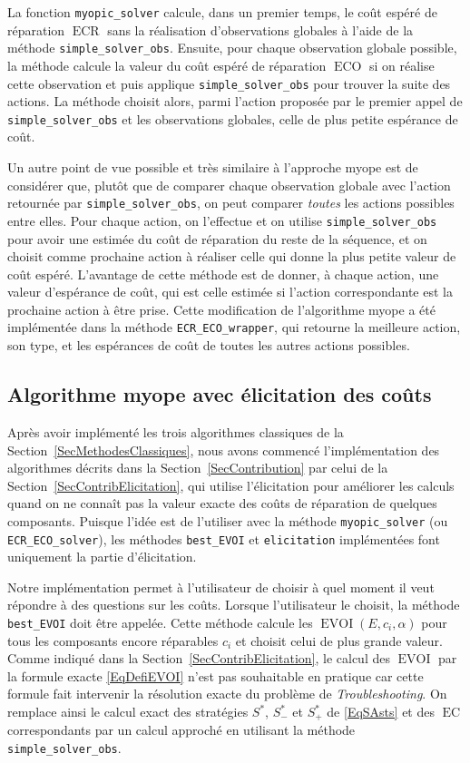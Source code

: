 \documentclass[a4paper,11pt]{article}
\theoremstyle{plain}
\theoremstyle{definition}
\DeclareMathOperator{\ECO}{ECO}
\DeclareMathOperator{\ECR}{ECR}
\DeclareMathOperator{\EC}{EC}
\DeclareMathOperator{\EVOI}{EVOI}
\begin{document}
La fonction \texttt{myopic\_solver} calcule, dans un premier temps, le coût espéré de réparation $\ECR$ sans la réalisation d'observations globales à l'aide de la méthode \texttt{simple\_solver\_obs}. Ensuite, pour chaque observation globale possible, la méthode calcule la valeur du coût espéré de réparation $\ECO$ si on réalise cette observation et puis applique \texttt{simple\_solver\_obs} pour trouver la suite des actions. La méthode choisit alors, parmi l'action proposée par le premier appel de \texttt{simple\_solver\_obs} et les observations globales, celle de plus petite espérance de coût.

Un autre point de vue possible et très similaire à l'approche myope est de considérer que, plutôt que de comparer chaque observation globale avec l'action retournée par \texttt{simple\_solver\_obs}, on peut comparer \emph{toutes} les actions possibles entre elles. Pour chaque action, on l'effectue et on utilise \texttt{simple\_solver\_obs} pour avoir une estimée du coût de réparation du reste de la séquence, et on choisit comme prochaine action à réaliser celle qui donne la plus petite valeur de coût espéré. L'avantage de cette méthode est de donner, à chaque action, une valeur d'espérance de coût, qui est celle estimée si l'action correspondante est la prochaine action à être prise. Cette modification de l'algorithme myope a été implémentée dans la méthode \texttt{ECR\_ECO\_wrapper}, qui retourne la meilleure action, son type, et les espérances de coût de toutes les autres actions possibles.

\subsection{Algorithme myope avec élicitation des coûts}
\label{SecImplElicitation}

Après avoir implémenté les trois algorithmes classiques de la Section~\ref{SecMethodesClassiques}, nous avons commencé l'implémentation des algorithmes décrits dans la Section~\ref{SecContribution} par celui de la Section~\ref{SecContribElicitation}, qui utilise l'élicitation pour améliorer les calculs quand on ne connaît pas la valeur exacte des coûts de réparation de quelques composants. Puisque l'idée est de l'utiliser avec la méthode \texttt{myopic\_solver} (ou \texttt{ECR\_ECO\_solver}), les méthodes \texttt{best\_EVOI} et \texttt{elicitation} implémentées font uniquement la partie d'élicitation.

Notre implémentation permet à l'utilisateur de choisir à quel moment il veut répondre à des questions sur les coûts. Lorsque l'utilisateur le choisit, la méthode \texttt{best\_EVOI} doit être appelée. Cette méthode calcule les $\EVOI(E, c_i, \alpha)$ pour tous les composants encore réparables $c_i$ et choisit celui de plus grande valeur. Comme indiqué dans la Section~\ref{SecContribElicitation}, le calcul des $\EVOI$ par la formule exacte \eqref{EqDefiEVOI} n'est pas souhaitable en pratique car cette formule fait intervenir la résolution exacte du problème de \emph{Troubleshooting}. On remplace ainsi le calcul exact des stratégies $S^\ast$, $S_-^\ast$ et $S_+^\ast$ de \eqref{EqSAsts} et des $\EC$ correspondants par un calcul approché en utilisant la méthode \texttt{simple\_solver\_obs}.
\end{document}
